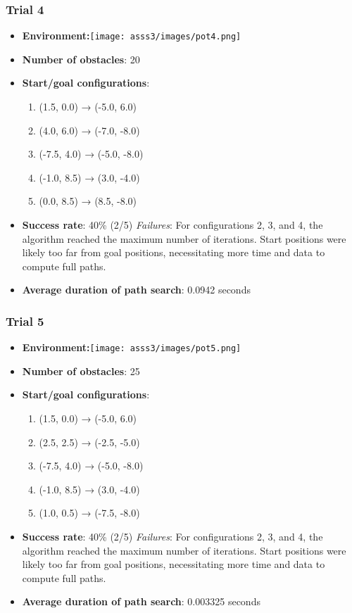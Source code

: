 \documentclass{article}
\begin{document}
\subsubsection{Trial 4}

\begin{itemize}
    \item \textbf{Environment:}\texttt{[image: asss3/images/pot4.png]}
    \item \textbf{Number of obstacles}: 20
    \item \textbf{Start/goal configurations}: 
    \begin{enumerate}
        \item (1.5, 0.0) → (-5.0, 6.0)
        \item (4.0, 6.0) → (-7.0, -8.0)
        \item (-7.5, 4.0) → (-5.0, -8.0)
        \item (-1.0, 8.5) → (3.0, -4.0)
        \item (0.0, 8.5) → (8.5, -8.0)
    \end{enumerate}
    \item \textbf{Success rate}: 40\% (2/5) 
\textit{Failures}: For configurations 2, 3, and 4, the algorithm reached the maximum number of iterations. Start positions were likely too far from goal positions, necessitating more time and data to compute full paths.

    \item \textbf{Average duration of path search}: 0.0942 seconds
\end{itemize}

\subsubsection{Trial 5}

\begin{itemize}
    \item \textbf{Environment:}\texttt{[image: asss3/images/pot5.png]}
    \item \textbf{Number of obstacles}: 25
    \item \textbf{Start/goal configurations}: 
    \begin{enumerate}
        \item (1.5, 0.0) → (-5.0, 6.0)
        \item (2.5, 2.5) → (-2.5, -5.0)
        \item (-7.5, 4.0) → (-5.0, -8.0)
        \item (-1.0, 8.5) → (3.0, -4.0)
        \item (1.0, 0.5) → (-7.5, -8.0)
    \end{enumerate}
    \item \textbf{Success rate}: 40\% (2/5) 
\textit{Failures}: For configurations 2, 3, and 4, the algorithm reached the maximum number of iterations. Start positions were likely too far from goal positions, necessitating more time and data to compute full paths.

    \item \textbf{Average duration of path search}: 0.003325 seconds
\end{itemize}
\end{document}
